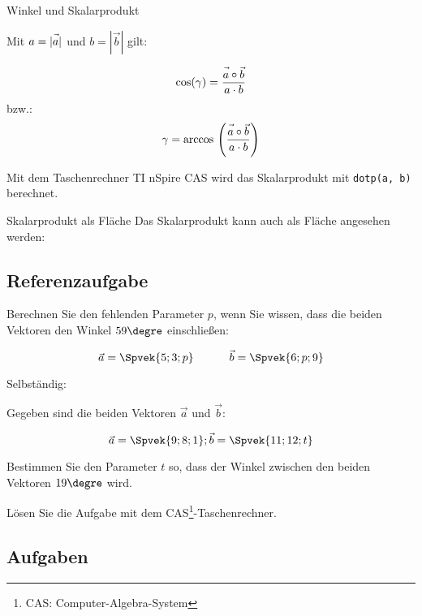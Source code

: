 \begin{gesetz}{Winkel und
    Skalarprodukt}{}


  Mit $a=|\vec{\vphantom{b}a}|$ und $b = |\vec{b}|$ gilt:
  
  $$\cos(\gamma) = \frac{\vec{a\vphantom{b}}\circ\vec{b}}{a\cdot b}$$
  bzw.:
  $$\gamma = \arccos{} \left(\frac{\vec{a\vphantom{b}}\circ\vec{b}}{a\cdot b}\right)$$
  
\end{gesetz}

Mit dem Taschenrechner TI nSpire CAS wird das Skalarprodukt mit
\texttt{dotp(a, b)} berechnet.

\begin{bemerkung}{Skalarprodukt als Fläche}{}
  Das Skalarprodukt kann auch als Fläche angesehen werden:
  
\end{bemerkung}
\newpage
\subsection{Referenzaufgabe}
Berechnen Sie den fehlenden Parameter $p$, wenn Sie wissen, dass die
beiden Vektoren den Winkel $59\degre$ einschließen:

$$\vec{a} = \Spvek{5;3;p} \hspace{11mm} \vec{b} = \Spvek{6;p;9}$$


  Selbständig:

Gegeben sind die beiden Vektoren $\vec{a}$ und $\vec{b}$:

$$\vec{a} = \Spvek{9;8;1}; \vec{b} = \Spvek{11;12;t}$$

Bestimmen Sie den Parameter $t$ so, dass der Winkel zwischen den
beiden Vektoren $19\degre$ wird.

Lösen Sie die Aufgabe mit dem CAS\footnote{CAS: Computer-Algebra-System}-Taschenrechner.



  
  
  \newpage
  
  \subsection*{Aufgaben}

